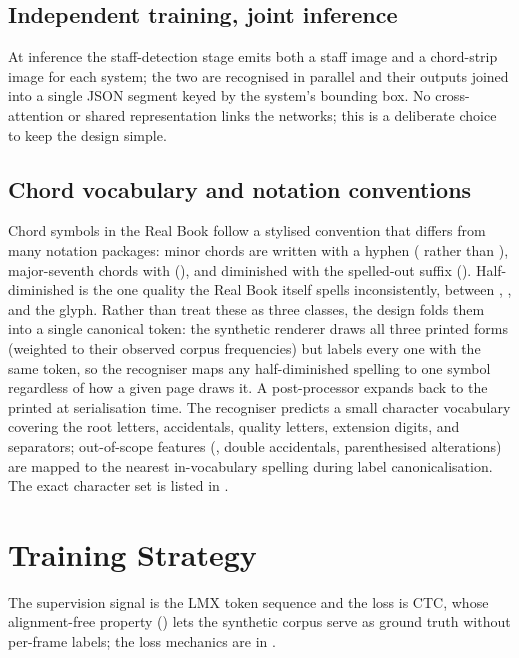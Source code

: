 \subsection{Independent training, joint inference}

At inference the staff-detection stage emits both a staff image and a
chord-strip image for each system; the two are recognised in parallel
and their outputs joined into a single JSON segment keyed by the
system's bounding box. No cross-attention or shared representation
links the networks; this is a deliberate choice to keep the design simple.

\subsection{Chord vocabulary and notation conventions}

Chord symbols in the Real Book follow a stylised convention that
differs from many notation packages: minor chords are written with a
hyphen ( rather than ), major-seventh chords with
 (), and diminished with the spelled-out
 suffix ().
Half-diminished is the one quality the Real Book itself spells
inconsistently, between , , and the 
glyph. Rather than treat these as three classes, the design folds them
into a single canonical token: the synthetic renderer draws all three
printed forms (weighted to their observed corpus frequencies) but
labels every one with the same  token, so the recogniser maps
any half-diminished spelling to one symbol regardless of how a given
page draws it. A post-processor expands  back to the printed
 at serialisation time.
The recogniser predicts a small character vocabulary covering the root
letters, accidentals, quality letters, extension digits, and
separators; out-of-scope features (, double accidentals,
parenthesised alterations) are mapped to the nearest in-vocabulary
spelling during label canonicalisation. The exact character set is
listed in .

\section{Training Strategy}
\label{sec:design-training}

The supervision signal is the LMX token sequence and the loss is CTC,
whose alignment-free property () lets the synthetic
corpus serve as ground truth without per-frame labels; the loss
mechanics are in .

